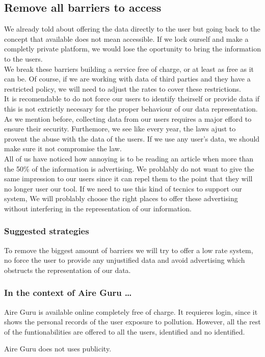 \subsection{Remove all barriers to access}
We already told about offering the data directly to the user but going back to the concept that available
does not mean accessible. If we lock ourself and make a completly private platform, we would lose the oportunity
to bring the information to the users.\\

We break these barriers building a service free of charge, or at least as free as it can be. Of course, if we are 
working with data of third parties and they have a restricted policy, we will need to adjust the rates to cover
these restrictions.\\

It is recomendable to do not force our users to identify theirself or provide data if this is not
extrictly necesary for the proper behaviour of our data representation. As we mention before, collecting data from our
users requires a major efford to ensure their security. Furthemore, we see like every year, the laws ajust to provent
the abuse with the data of the users. If we use any user's data, we should make sure it not compromise the law.\\

All of us have noticed how annoying is to be reading an article when more than the 50\% of the information is advertising.
We problably do not want to give the same impression to our users since it can repel them to the point that they will no longer
user our tool. If we need to use this kind of tecnics to support our system, We will problably choose the right places to offer 
these advertising without interfering in the representation of our information.


\subsubsection*{Suggested strategies} 

To remove the biggest amount of barriers we will try to offer a low rate system, no force the user to provide any unjustified 
data and avoid advertising which obstructs the representation of our data.

\subsubsection*{In the context of Aire Guru \ldots} 

Aire Guru is available online completely free of charge. It requieres login, since it shows the personal records of the 
user exposure to pollution. However, all the rest of the funtionabilities are offered to all the users, identified and no 
identified.

Aire Guru does not uses publicity.
